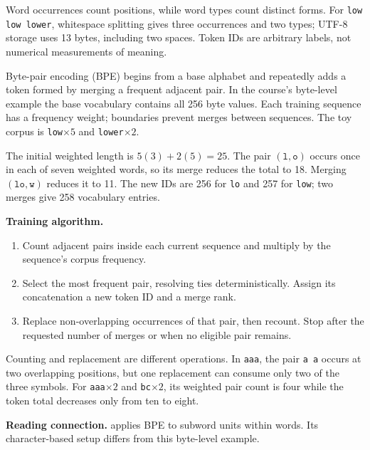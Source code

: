 Word occurrences count positions, while word types count distinct forms.
For \texttt{low low lower}, whitespace splitting gives three occurrences
and two types; UTF-8 storage uses 13 bytes, including two spaces. Token IDs
are arbitrary labels, not numerical measurements of meaning.

Byte-pair encoding (BPE) begins from a base alphabet and repeatedly adds a
token formed by merging a frequent adjacent pair. In the course's byte-level
example the base vocabulary contains all 256 byte values. Each training
sequence has a frequency weight; boundaries prevent merges between sequences.
The toy corpus is \texttt{low}$\times5$ and \texttt{lower}$\times2$.


The initial weighted length is $5(3)+2(5)=25$. The pair
$(\texttt{l},\texttt{o})$ occurs once in each of seven weighted words, so
its merge reduces the total to 18. Merging $(\texttt{lo},\texttt{w})$
reduces it to 11. The new IDs are 256 for \texttt{lo} and 257 for
\texttt{low}; two merges give 258 vocabulary entries.

\textbf{Training algorithm.}
\begin{enumerate}
\item Count adjacent pairs inside each current sequence and multiply by
the sequence's corpus frequency.
\item Select the most frequent pair, resolving ties deterministically.
Assign its concatenation a new token ID and a merge rank.
\item Replace non-overlapping occurrences of that pair, then recount.
Stop after the requested number of merges or when no eligible pair remains.
\end{enumerate}
Counting and replacement are different operations. In \texttt{aaa}, the
pair \texttt{a a} occurs at two overlapping positions, but one replacement
can consume only two of the three symbols. For \texttt{aaa}$\times2$ and
\texttt{bc}$\times2$, its weighted pair count is four while the token total
decreases only from ten to eight.

\textbf{Reading connection.}  applies BPE to subword units
within words. Its character-based setup differs from this byte-level example.

